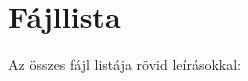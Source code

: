 \section{Fájllista}
Az összes fájl listája rövid leírásokkal\+:\begin{DoxyCompactList}
\item{}
\item{}
\end{DoxyCompactList}
